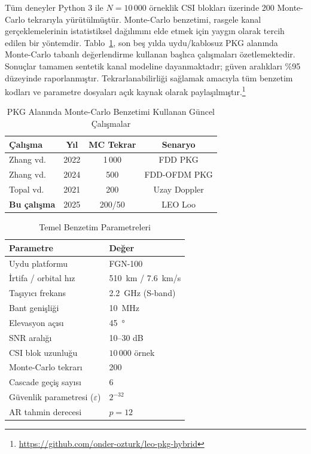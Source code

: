 \documentclass[conference,a4paper]{IEEEtran}
\begin{document}
Tüm deneyler Python 3 ile $N=10\,000$ örneklik CSI blokları üzerinde 200 Monte-Carlo tekrarıyla yürütülmüştür. Monte-Carlo benzetimi, rasgele kanal gerçeklemelerinin istatistiksel dağılımını elde etmek için yaygın olarak tercih edilen bir yöntemdir. Tablo~\ref{tab:mc_lit}, son beş yılda uydu/kablosuz PKG alanında Monte-Carlo tabanlı değerlendirme kullanan başlıca çalışmaları özetlemektedir. Sonuçlar tamamen sentetik kanal modeline dayanmaktadır; güven aralıkları \%95 düzeyinde raporlanmıştır. Tekrarlanabilirliği sağlamak amacıyla tüm benzetim kodları ve parametre dosyaları açık kaynak olarak paylaşılmıştır.\footnote{\url{https://github.com/onder-ozturk/leo-pkg-hybrid}}

\begin{table}[t]
\caption{PKG Alanında Monte-Carlo Benzetimi Kullanan Güncel Çalışmalar}
\label{tab:mc_lit}
\centering
\begin{tabular}{>{\raggedright\arraybackslash}p{1.9cm}ccc}
\toprule
Çalışma & Yıl & MC Tekrar & Senaryo \\
\midrule
Zhang vd.\ \cite{zhang_fdd_dnn} & 2022 & 1\,000 & FDD PKG \\
Zhang vd.\ \cite{zhang_fdd_ofdm} & 2024 & 500 & FDD-OFDM PKG \\
Topal vd.\ \cite{topal_doppler} & 2021 & 200 & Uzay Doppler \\
\textbf{Bu çalışma} & 2025 & 200/50 & LEO Loo \\
\bottomrule
\end{tabular}
\end{table}

\begin{table}[t]
\caption{Temel Benzetim Parametreleri}
\label{tab:simparams}
\centering
\begin{tabular}{ll}
\toprule
Parametre & Değer \\
\midrule
Uydu platformu & FGN-100 \\
İrtifa / orbital hız & \SI{510}{km} / \SI{7.6}{km/s} \\
Taşıyıcı frekans & \SI{2.2}{GHz} (S-band) \\
Bant genişliği & \SI{10}{MHz} \\
Elevasyon açısı & \SI{45}{\degree} \\
SNR aralığı & 10--30 dB \\
CSI blok uzunluğu & $10\,000$ örnek \\
Monte-Carlo tekrarı & 200 \\
Cascade geçiş sayısı & 6 \\
Güvenlik parametresi ($\varepsilon$) & $2^{-32}$ \\
AR tahmin derecesi & $p=12$ \\
\bottomrule
\end{tabular}
\end{table}
\end{document}
